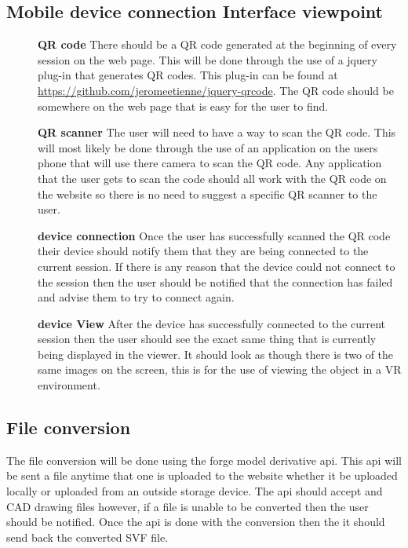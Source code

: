 \documentclass[letterpaper, 10pt, draftclsnofoot, compsoc, onecolumn]{IEEEtran}
\begin{document}
\subsection{Mobile device connection Interface viewpoint}
\begin{description}
	\item[]\textbf{QR code} There should be a QR code generated at the beginning of every session on the web page. This will be done through the use of a jquery plug-in that generates QR codes. This plug-in can be found at \href{https://github.com/jeromeetienne/jquery-qrcode}{https://github.com/jeromeetienne/jquery-qrcode}. The QR code should be somewhere on the web page that is easy for the user to find. 
	\item[]\textbf{QR scanner} The user will need to have a way to scan the QR code. This will most likely be done through the use of an application on the users phone that will use there camera to scan the QR code. Any application that the user gets to scan the code should all work with the QR code on the website so there is no need to suggest a specific QR scanner to the user. 
	\item[]\textbf{device connection} Once the user has successfully scanned the QR code their device should notify them that they are being connected to the current session. If there is any reason that the device could not connect to the session then the user should be notified that the connection has failed and advise them to try to connect again.
	\item[]\textbf{device View} After the device has successfully connected to the current session then the user should see the exact same thing that is currently being displayed in the viewer. It should look as though there is two of the same images on the screen, this is for the use of viewing the object in a VR environment.  
\end{description}

\subsection{File conversion}
\label{model derivative} 
	The file conversion will be done using the forge model derivative api. This api will be sent a file anytime that one is uploaded to the website whether it be uploaded locally or uploaded from an outside storage device. The api should accept and CAD drawing files however, if a file is unable to be converted then the user should be notified. Once the api is done with the conversion then the it should send back the converted SVF file. 
\end{document}
